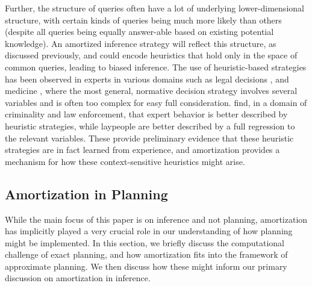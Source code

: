 Further, the structure of queries often have a lot of underlying lower-dimensional structure, with certain kinds of queries being much more likely than others (despite all queries being equally answer-able based on existing potential knowledge). An amortized inference strategy will reflect this structure, as discussed previously, and could encode heuristics that hold only in the space of common queries, leading to biased inference. The use of heuristic-based strategies has been observed in experts in various domains such as legal decisions \citep{dhami2001bailing}, and medicine \citep{reyna2006physician}, where the most general, normative decision strategy involves several variables and is often too complex for easy full consideration. \cite{garcia2009take} find, in a domain of criminality and law enforcement, that expert behavior is better described by heuristic strategies, while laypeople are better described by a full regression to the relevant variables. These provide preliminary evidence that these heuristic strategies are in fact learned from experience, and amortization provides a mechanism for how these context-sensitive heuristics might arise.



\subsection{Amortization in Planning}

While the main focus of this paper is on inference and not planning, amortization has implicitly played a very crucial role in our understanding of how planning might be implemented. In this section, we briefly discuss the computational challenge of exact planning, and how amortization fits into the framework of approximate planning. We then discuss how these might inform our primary discussion on amortization in inference.

